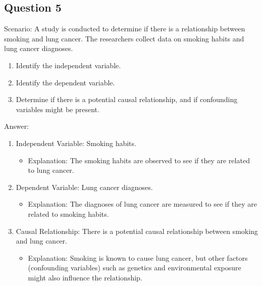 \documentclass[
  letterpaper,
  DIV=11,
  numbers=noendperiod]{scrreprt}
\providecommand{\tightlist}{%
  \setlength{\itemsep}{0pt}\setlength{\parskip}{0pt}}\usepackage{longtable,booktabs,array}
\begin{document}
\subsection*{Question 5}\label{question-5}

Scenario: A study is conducted to determine if there is a relationship
between smoking and lung cancer. The researchers collect data on smoking
habits and lung cancer diagnoses.

\begin{enumerate}
\def\labelenumi{\arabic{enumi}.}
\item
  Identify the independent variable.
\item
  Identify the dependent variable.
\item
  Determine if there is a potential causal relationship, and if
  confounding variables might be present.
\end{enumerate}

Answer:

\begin{enumerate}
\def\labelenumi{\arabic{enumi}.}
\tightlist
\item
  Independent Variable: Smoking habits.

  \begin{itemize}
  \tightlist
  \item
    Explanation: The smoking habits are observed to see if they are
    related to lung cancer.
  \end{itemize}
\item
  Dependent Variable: Lung cancer diagnoses.

  \begin{itemize}
  \tightlist
  \item
    Explanation: The diagnoses of lung cancer are measured to see if
    they are related to smoking habits.
  \end{itemize}
\item
  Causal Relationship: There is a potential causal relationship between
  smoking and lung cancer.

  \begin{itemize}
  \tightlist
  \item
    Explanation: Smoking is known to cause lung cancer, but other
    factors (confounding variables) such as genetics and environmental
    exposure might also influence the relationship.
  \end{itemize}
\end{enumerate}
\end{document}
